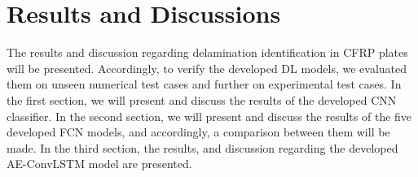 
\chapter[Results and Discussions]{Results and Discussions}
\label{ch5}

The results and discussion regarding delamination identification in CFRP plates will be presented. 
Accordingly, to verify the developed DL models, we evaluated them on unseen numerical test cases and further on experimental test cases.
In the first section, we will present and discuss the results of the developed CNN classifier. 
In the second section, we will present and discuss the results of the five developed FCN models, and accordingly, a comparison between them will be made.
In the third section, the results, and discussion regarding the developed AE-ConvLSTM model are presented.







